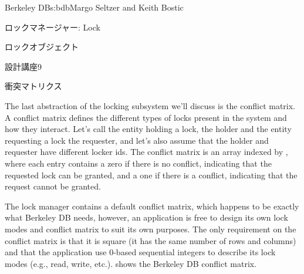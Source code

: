 \begin{aosachapter}{Berkeley DB}{s:bdb}{Margo Seltzer and Keith Bostic}
\begin{aosasect1}{ロックマネージャー: Lock}
\begin{aosasect2}{ロックオブジェクト}
\begin{aosabox}{設計講座9}
\end{aosabox}

\end{aosasect2}

\begin{aosasect2}{衝突マトリクス}

The last abstraction of the locking subsystem we'll discuss is the
conflict matrix. A conflict matrix defines the different types of
locks present in the system and how they interact. Let's call the
entity holding a lock, the holder and the entity requesting a lock the
requester, and let's also assume that the holder and requester have
different locker ids.  The conflict matrix is an array indexed by
\code{[requester][holder]}, where each entry contains a zero if there
is no conflict, indicating that the requested lock can be granted, and
a one if there is a conflict, indicating that the request cannot be
granted.

The lock manager contains a default conflict matrix, which happens to
be exactly what Berkeley DB needs, however, an application is free to
design its own lock modes and conflict matrix to suit its own
purposes.  The only requirement on the conflict matrix is that it is
square (it has the same number of rows and columns) and that the
application use 0-based sequential integers to describe its lock
modes (e.g., read, write, etc.).   
 shows the Berkeley DB conflict matrix.


\end{aosasect2}
\end{aosasect1}
\end{aosachapter}
